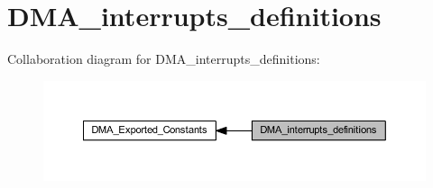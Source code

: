 \hypertarget{group___d_m_a__interrupts__definitions}{}\section{D\+M\+A\+\_\+interrupts\+\_\+definitions}
\label{group___d_m_a__interrupts__definitions}
Collaboration diagram for D\+M\+A\+\_\+interrupts\+\_\+definitions\+:
\nopagebreak
\begin{figure}[H]
\begin{center}
\leavevmode
\includegraphics[width=350pt]{group___d_m_a__interrupts__definitions}
\end{center}
\end{figure}
